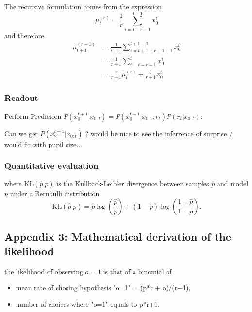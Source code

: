 \documentclass[12pt,english]{article}%
\newcommand{\KL}[2]{\text{KL}( #1 | #2 )}
\newcommand{\pa}[1]{\left( #1 \right)}
\newcommand{\eq}[1]{\begin{equation*}#1\end{equation*}}
\newcommand{\eqs}[1]{\begin{align*}#1\end{align*}}
\newcommand{\seeApp}[1]{Appendix~\ref{app:#1}}
\begin{document}
The recursive formulation comes from the expression
\eq{
\mu^{(r)}_{t} = \frac 1 r \sum_{i=t-r-1}^{t-1} x_0^i
}
and therefore
\eqs{
\mu^{(r+1)}_{t+1} 	&= \frac{1}{r+1} \sum_{i=t+1-r-1-1}^{t+1-1} x_0^i \\
					&= \frac{1}{r+1} \sum_{i=t-r-1}^{t} x_0^i \\
					&= \frac{r}{r+1} \mu^{(r)}_{t} + \frac{1}{r+1} x_0^t
}

\subsubsection{Readout}
\label{app:readout}

Perform Prediction $P (x_0^{t+1} | x_{0:t}) = P (x_0^{t+1}|x_{0:t} , r_t) P (r_t|x_{0:t})$,

Can we get  $P (x_2^{t+1} | x_{0:t}) $ ? would be nice to see the inferrence of surprise / would fit with pupil size...

\subsubsection{Quantitative evaluation}

where $\KL{\hat p}{p}$ is the Kullback-Leibler divergence between samples $\hat p$ and model $p$ under a Bernoulli distribution
\begin{equation}
\KL{\hat p}{p} = \hat{p} \log\pa{\frac{\hat p}{p}} + (1-\hat p) \log\pa{\frac{1-\hat p}{1-p}}.
\end{equation}


\subsection{Appendix 3: Mathematical derivation of the likelihood}
\label{app:likelihood}



the likelihood of observing $o=1$ is that of a binomial of
	\begin{itemize}
		\item  mean rate of chosing hypothesis "o=1" = (p*r + o)/(r+1),
		\item number of choices where  "o=1" equals to p*r+1.
	\end{itemize}
\end{document}
